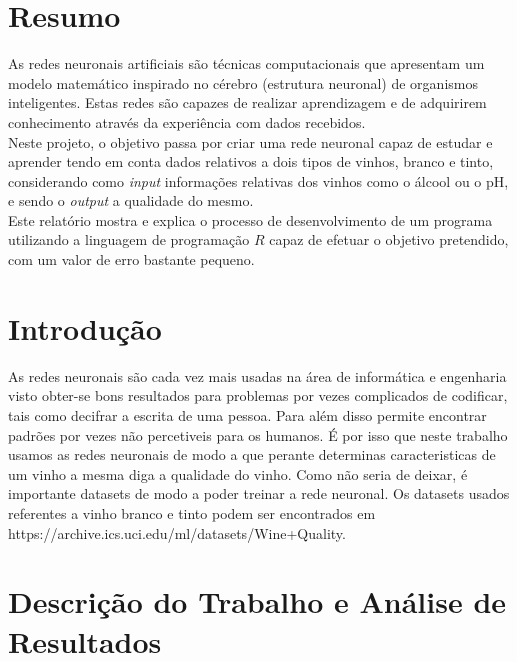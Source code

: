 \documentclass{article}
\begin{document}
\section{Resumo}
As redes neuronais artificiais são técnicas computacionais que apresentam um modelo matemático inspirado no cérebro (estrutura neuronal) de organismos inteligentes. Estas redes são capazes de realizar aprendizagem e de adquirirem conhecimento através da experiência com dados recebidos.\\
Neste projeto, o objetivo passa por criar uma rede neuronal capaz de estudar e aprender tendo em conta dados relativos a dois tipos de vinhos, branco e tinto, considerando como \textit{input} informações relativas dos vinhos como o álcool ou o pH, e sendo o \textit{output} a qualidade do mesmo.\\
Este relatório mostra e explica o processo de desenvolvimento de um programa utilizando a linguagem de programação $R$ capaz de efetuar o objetivo pretendido, com um valor de erro bastante pequeno.  

\vspace*{\fill}

\newpage

\vspace*{\fill}
\tableofcontents
\vspace*{\fill}

\newpage

\vspace*{\fill}
\section{Introdução}
As redes neuronais são cada vez mais usadas na área de informática e engenharia visto obter-se bons resultados para problemas por vezes complicados de codificar, tais como decifrar a escrita de uma pessoa. Para além disso permite encontrar padrões por vezes não percetiveis para os humanos. É por isso que neste trabalho usamos as redes neuronais de modo a que perante determinas caracteristicas de um vinho a mesma diga a qualidade do vinho. Como não seria de deixar, é importante datasets de modo a poder treinar a rede neuronal. Os datasets usados referentes a vinho branco e tinto podem ser encontrados em https://archive.ics.uci.edu/ml/datasets/Wine+Quality.
\vspace*{\fill}

\newpage

\section{Descrição do Trabalho e Análise de Resultados}
\end{document}
